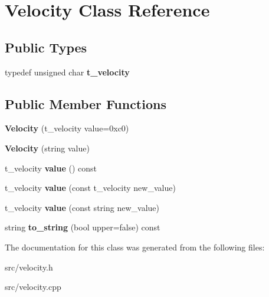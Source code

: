 \hypertarget{class_velocity}{}\section{Velocity Class Reference}
\label{class_velocity}
\subsection*{Public Types}
\begin{DoxyCompactItemize}
\item 
typedef unsigned char {\bfseries t\+\_\+velocity}\hypertarget{class_velocity_a72644ed53c20de5fdeb7ab1e2a80a792}{}\label{class_velocity_a72644ed53c20de5fdeb7ab1e2a80a792}

\end{DoxyCompactItemize}
\subsection*{Public Member Functions}
\begin{DoxyCompactItemize}
\item 
{\bfseries Velocity} (t\+\_\+velocity value=0xc0)\hypertarget{class_velocity_a9230f812f29824b862f90bdd5405c0b3}{}\label{class_velocity_a9230f812f29824b862f90bdd5405c0b3}

\item 
{\bfseries Velocity} (string value)\hypertarget{class_velocity_a4c63d5dd1466936f725f0ae10bfb38ca}{}\label{class_velocity_a4c63d5dd1466936f725f0ae10bfb38ca}

\item 
t\+\_\+velocity {\bfseries value} () const \hypertarget{class_velocity_aeeb841e4b93ea3761143167bec58757e}{}\label{class_velocity_aeeb841e4b93ea3761143167bec58757e}

\item 
t\+\_\+velocity {\bfseries value} (const t\+\_\+velocity new\+\_\+value)\hypertarget{class_velocity_a0578fb134a2e6555472c26453a17046a}{}\label{class_velocity_a0578fb134a2e6555472c26453a17046a}

\item 
t\+\_\+velocity {\bfseries value} (const string new\+\_\+value)\hypertarget{class_velocity_a35644ccc58eee2a255a89ddaa379405d}{}\label{class_velocity_a35644ccc58eee2a255a89ddaa379405d}

\item 
string {\bfseries to\+\_\+string} (bool upper=false) const \hypertarget{class_velocity_a0e6c0c47531f818792c3b542298882e3}{}\label{class_velocity_a0e6c0c47531f818792c3b542298882e3}

\end{DoxyCompactItemize}


The documentation for this class was generated from the following files\+:\begin{DoxyCompactItemize}
\item 
src/velocity.\+h\item 
src/velocity.\+cpp\end{DoxyCompactItemize}
